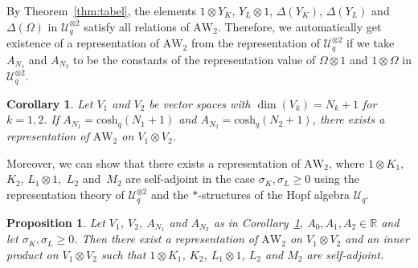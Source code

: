 \documentclass[pdftex]{sigma}
\numberwithin{equation}{section}
\newtheorem{Corollary}[Theorem]{Corollary}
\newtheorem{Proposition}[Theorem]{Proposition}
 { \theoremstyle{definition}
\newtheorem{Definition}[Theorem]{Definition}
\newtheorem{Note}[Theorem]{Note}
\newtheorem{Example}[Theorem]{Example}
\newtheorem{Remark}[Theorem]{Remark} }
\newcommand{\RR}{\mathbb{R}}
\newcommand{\AW}[1]{\mathrm{AW}_{#1}}
\newcommand{\chq}{\mathrm{cosh}_q}
\newcommand{\tensor}[1]{^{\otimes{#1}}}
\newcommand{\Uq}{\mathcal{U}_q}
\begin{document}
By Theorem~\ref{thm:tabel}, the elements $1\otimes Y_K$, $Y_L\otimes 1$, $\Delta(Y_K)$, $\Delta(Y_L)$ and $\Delta(\Omega)$ in $\Uq\tensor{2}$ satisfy all relations of $\AW{2}$. Therefore, we automatically get existence of a representation of $\AW{2}$ from the representation of $\Uq\tensor{2}$ if we take $A_{N_1}$ and $A_{N_2}$ to be the constants of the representation value of $\Omega\otimes1$ and $1\otimes \Omega$ in $\Uq\tensor{2}$.
\begin{Corollary}\label{cor:aw2reprexist}
	Let $V_1$ and $V_2$ be vector spaces with $\dim(V_k)=N_k+1$ for $k=1,2$. If $A_{N_1}=\chq(N_1+1)$ and $A_{N_2}=\chq(N_2+1)$, there exists a representation of $\AW{2}$ on $V_1\otimes V_2$.
\end{Corollary}
Moreover, we can show that there exists a representation of $\AW{2}$, where $1\otimes K_1$, $K_2$, $L_1\otimes 1$,~$L_2$ and~$M_2$ are self-adjoint in the case $\sigma_K,\sigma_L\geq0$ using the representation theory of $\Uq\tensor{2}$ and the $*$-structures of the Hopf algebra $\Uq$.
\begin{Proposition}\label{prop:*reprexists}
	Let $V_1$, $V_2$, $A_{N_1}$ and $A_{N_2}$ as in Corollary~{\rm \ref{cor:aw2reprexist}}, $A_0,A_1,A_2\in\RR$ and let ${\sigma_K,\sigma_L\geq 0}$. Then there exist a representation of $\AW{2}$ on $V_1\otimes V_2$ and an inner product on $V_1\otimes V_2$ such that $1\otimes K_1$, $K_2$, $L_1\otimes 1$, $L_2$ and $M_2$ are self-adjoint.			
\end{Proposition}
\end{document}
